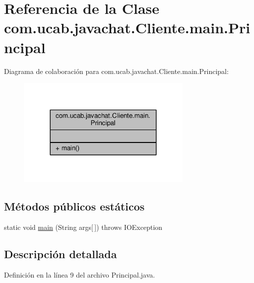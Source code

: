 \hypertarget{classcom_1_1ucab_1_1javachat_1_1_cliente_1_1main_1_1_principal}{\section{Referencia de la Clase com.\-ucab.\-javachat.\-Cliente.\-main.\-Principal}
\label{classcom_1_1ucab_1_1javachat_1_1_cliente_1_1main_1_1_principal}
}


Diagrama de colaboración para com.\-ucab.\-javachat.\-Cliente.\-main.\-Principal\-:\nopagebreak
\begin{figure}[H]
\begin{center}
\leavevmode
\includegraphics[width=240pt]{classcom_1_1ucab_1_1javachat_1_1_cliente_1_1main_1_1_principal__coll__graph}
\end{center}
\end{figure}
\subsection*{Métodos públicos estáticos}
\begin{DoxyCompactItemize}
\item 
static void \hyperlink{classcom_1_1ucab_1_1javachat_1_1_cliente_1_1main_1_1_principal_a0560b184945ff743d2f7a9225b2a8e12}{main} (String args\mbox{[}$\,$\mbox{]})  throws I\-O\-Exception 
\end{DoxyCompactItemize}


\subsection{Descripción detallada}


Definición en la línea 9 del archivo Principal.\-java.



